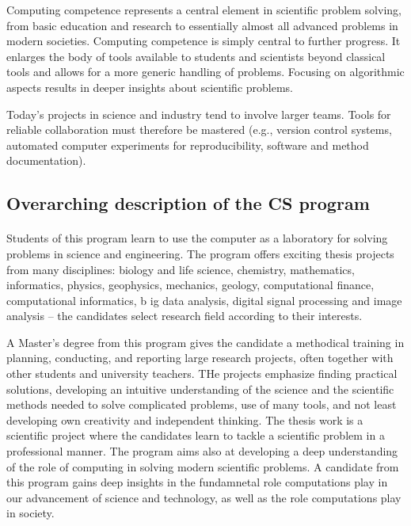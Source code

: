 \documentclass[%
oneside,                 %
final,                   %
10pt]{article}
\begin{document}
Computing competence represents a central element
in scientific problem solving, from basic education and research to
essentially almost all advanced problems in modern
societies. Computing competence is simply central to further
progress. It enlarges the body of tools available to students and
scientists beyond classical tools and allows for a more generic
handling of problems. Focusing on algorithmic aspects results in
deeper insights about scientific problems.

Today's projects in science and industry tend to involve larger teams. Tools for reliable collaboration must therefore be mastered (e.g., version control systems, automated computer experiments for reproducibility, software and method documentation).



\subsection{Overarching description of the CS program}

\paragraph{}
Students of this program learn to use the computer as a laboratory for
solving problems in science and engineering. The program offers
exciting thesis projects from many disciplines: biology and life
science, chemistry, mathematics, informatics, physics, geophysics,
mechanics, geology, computational finance, computational informatics, b
ig data analysis, digital signal processing
and image analysis – the candidates select research field according to
their interests.

A Master’s degree from this program gives the candidate a methodical
training in planning, conducting, and reporting large research
projects, often together with other students and university teachers.
THe projects emphasize finding practical solutions, developing an
intuitive understanding of the science and the scientific methods
needed to solve complicated problems, use of many tools, and not least
developing own creativity and independent thinking. The thesis
work is a scientific project where the candidates learn to tackle a
scientific problem in a professional manner.   The program aims also at
developing a deep understanding of the role of computing in solving modern scientific
problems. A candidate from this program gains  deep insights in the fundamnetal role
computations play  in our advancement of science and technology, as well as the role computations play  in society.
\end{document}
